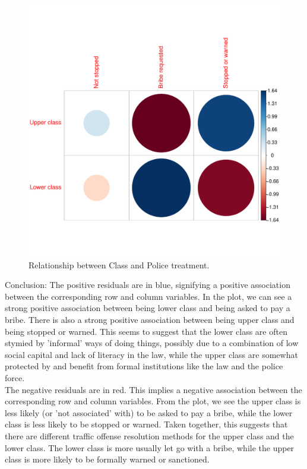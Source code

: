 \documentclass[12pt,letterpaper]{article}
\begin{document}
\vspace{.5cm}
  
\vspace{.5cm}
\begin{figure}[hbtp!]\centering
	\caption{\footnotesize Relationship between Class and Police treatment.}
	\label{fig:plot_1}
	\includegraphics[width=.75\textwidth]{corrplot_class_treatment.pdf}
\end{figure}
\noindent Conclusion: The positive residuals are in blue, signifying a positive association between the corresponding row and column variables. In the plot, we can see a strong positive association between being lower class and being asked to pay a bribe. There is also a strong positive association between being upper class and being stopped or warned. This seems to suggest that the lower class are often stymied by 'informal' ways of doing things, possibly due to a combination of low social capital and lack of literacy in the law, while the upper class are somewhat protected by and benefit from formal institutions like the law and the police force.\\
\noindent The negative residuals are in red. This implies a negative association between the corresponding row and column variables. From the plot, we see the upper class  is less likely (or 'not associated' with) to be asked to pay a bribe, while the  lower class is less likely to be stopped or warned. Taken together, this suggests that there are different traffic offense resolution methods for the upper class and the lower class. The lower class is more usually let go with a bribe, while the upper class is more likely to be formally warned or sanctioned.\\
	
\end{document}
